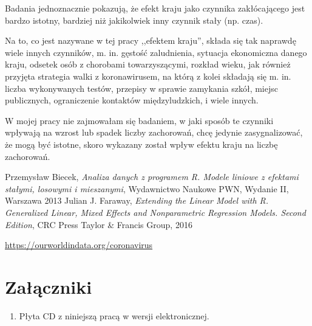 \documentclass[12pt]{mwbk}
\theoremstyle{plain}
\theoremstyle{definition}
\theoremstyle{remark}
\begin{document}
Badania jednoznacznie pokazują, że efekt kraju jako czynnika zakłócającego jest bardzo istotny, bardziej niż jakikolwiek inny czynnik stały (np. czas).

Na to, co jest nazywane w tej pracy ,,efektem kraju'', składa się tak naprawdę wiele innych czynników, m. in. gęstość zaludnienia, sytuacja ekonomiczna danego kraju, odsetek osób z chorobami towarzyszącymi, rozkład wieku, jak również przyjęta strategia walki z koronawirusem, na którą z kolei składają się m. in. liczba wykonywanych testów, przepisy w sprawie zamykania szkół, miejsc publicznych, ograniczenie kontaktów międzyludzkich, i wiele innych.

W mojej pracy nie zajmowałam się badaniem, w jaki sposób te czynniki wpływają na wzrost lub spadek liczby zachorowań, chcę jedynie zasygnalizować, że mogą być istotne, skoro wykazany został wpływ efektu kraju na liczbę zachorowań.

\begin{thebibliography}{99}

 Przemysław Biecek, \emph{Analiza danych z programem R. Modele liniowe z efektami stałymi, losowymi i mieszanymi}, Wydawnictwo Naukowe PWN, Wydanie II, Warszawa 2013
 Julian J. Faraway, \emph{Extending the Linear Model with R. Generalized Linear, Mixed Effects and Nonparametric Regression Models. Second Edition}, CRC Press Taylor \& Francis  Group, 2016

 \url{https://ourworldindata.org/coronavirus}

\end{thebibliography}



\listoffigures

\listoftables


\chapter*{Załączniki}
\begin{enumerate}
\item Płyta CD z niniejszą pracą w wersji elektronicznej.
\end{enumerate}
\end{document}
